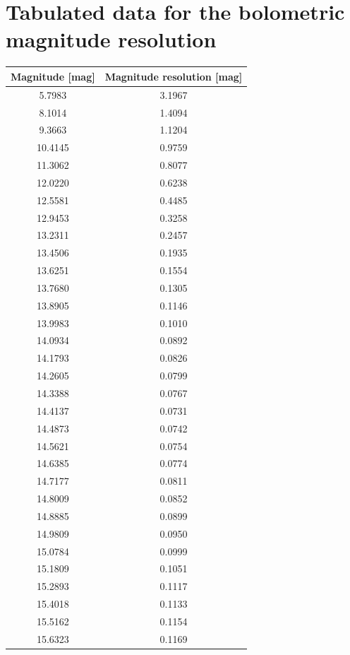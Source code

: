 \documentclass[fleqn,usenatbib]{mnras}
\begin{document}
\section{Tabulated data for the bolometric magnitude resolution}
\begin{table}
    \centering
    \begin{tabular}{c|c}
        Magnitude [mag] & Magnitude resolution [mag] \\\hline\hline
        5.7983 & 3.1967\\
        8.1014 & 1.4094\\
        9.3663 & 1.1204\\
        10.4145 & 0.9759\\
        11.3062 & 0.8077\\
        12.0220 & 0.6238\\
        12.5581 & 0.4485\\
        12.9453 & 0.3258\\
        13.2311 & 0.2457\\
        13.4506 & 0.1935\\\hline
        13.6251 & 0.1554\\
        13.7680 & 0.1305\\
        13.8905 & 0.1146\\
        13.9983 & 0.1010\\
        14.0934 & 0.0892\\
        14.1793 & 0.0826\\
        14.2605 & 0.0799\\
        14.3388 & 0.0767\\
        14.4137 & 0.0731\\
        14.4873 & 0.0742\\\hline
        14.5621 & 0.0754\\
        14.6385 & 0.0774\\
        14.7177 & 0.0811\\
        14.8009 & 0.0852\\
        14.8885 & 0.0899\\
        14.9809 & 0.0950\\
        15.0784 & 0.0999\\
        15.1809 & 0.1051\\
        15.2893 & 0.1117\\
        15.4018 & 0.1133\\\hline
        15.5162 & 0.1154\\
        15.6323 & 0.1169\\

\end{tabular}
\end{table}
\end{document}
